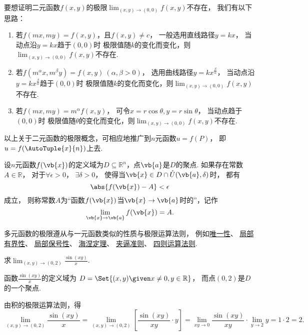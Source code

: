 \begin{remark}
要想证明二元函数\(f(x,y)\)的极限\(\lim_{(x,y)\to(0,0)} f(x,y)\)不存在，
我们有以下思路：
\begin{enumerate}
	\item 若\(f(mx,my) = f(x,y)\)，且\(f(x,y) \neq c\)，
	一般选用直线路径\(y=kx\)，
	当动点沿\(y=kx\)趋于\((0,0)\)时
	极限值随\(k\)的变化而变化，则\(\lim_{(x,y)\to(0,0)} f(x,y)\)不存在.

	\item 若\(f(m^\alpha x,m^\beta y) = f(x,y)\ (\alpha,\beta>0)\)，
	选用曲线路径\(y=kx^{\frac\beta\alpha}\)，
	当动点沿\(y=kx^{\frac\beta\alpha}\)趋于\((0,0)\)时
	极限值随\(k\)的变化而变化，则\(\lim_{(x,y)\to(0,0)} f(x,y)\)不存在.

	\item 若\(f(mx,my) = m^\alpha f(x,y)\)，
	可令\(x = r \cos\theta,y = r \sin\theta\)，
	当动点趋于\((0,0)\)时
	极限值随\(\theta\)的变化而变化，则\(\lim_{(x,y)\to(0,0)} f(x,y)\)不存在.
\end{enumerate}
\end{remark}

以上关于二元函数的极限概念，可相应地推广到\(n\)元函数\(u = f(P)\)，
即\(u = f(\AutoTuple{x}{n})\)上去.
\begin{definition}
设\(n\)元函数\(f(\vb{x})\)的定义域为\(D \subseteq \mathbb{R}^n\)，点\(\vb{a}\)是\(D\)的聚点.
如果存在常数\(A \in \mathbb{R}\)，
对于\(\forall\epsilon>0\)，
\(\exists\delta>0\)，
使得当\(\vb{x} \in D \cap \mathring{U}(\vb{a},\delta)\)时，
都有\[
	\abs{f(\vb{x}) - A} < \epsilon
\]成立，
则称常数\(A\)为“函数\(f(\vb{x})\)当\(\vb{x}\to\vb{a}\)时的”，记作\[
	\lim_{\vb{x}\to\vb{a}} f(\vb{x}) = A.
\]
\end{definition}

多元函数的极限遵从与一元函数类似的性质与极限运算法则，
例如\hyperref[theorem:极限.函数极限的唯一性]{唯一性}、
\hyperref[theorem:极限.函数极限的局部有界性]{局部有界性}、
\hyperref[theorem:极限.函数极限的局部保号性1]{局部保号性}、
\hyperref[theorem:极限.海涅定理]{海涅定理}、
\hyperref[theorem:函数极限.夹逼准则]{夹逼准则}、
\hyperref[theorem:极限.极限的四则运算法则]{四则运算法则}.

\begin{example}
求\(\lim_{(x,y)\to(0,2)} \frac{\sin(xy)}{x}\).
\begin{solution}
函数\(\frac{\sin(xy)}{x}\)的定义域为
\(D = \Set{ (x,y) \given x\neq0, y\in\mathbb{R} }\)，
而点\((0,2)\)是\(D\)的一个聚点.

由积的极限运算法则，得\[
	\lim_{(x,y)\to(0,2)} \frac{\sin(xy)}{x}
	= \lim_{(x,y)\to(0,2)} \left[ \frac{\sin(xy)}{xy} \cdot y \right]
	= \lim_{xy\to0} \frac{\sin(xy)}{xy} \cdot \lim_{y\to2} y
	= 1 \cdot 2 = 2.
\]
\end{solution}
\end{example}

